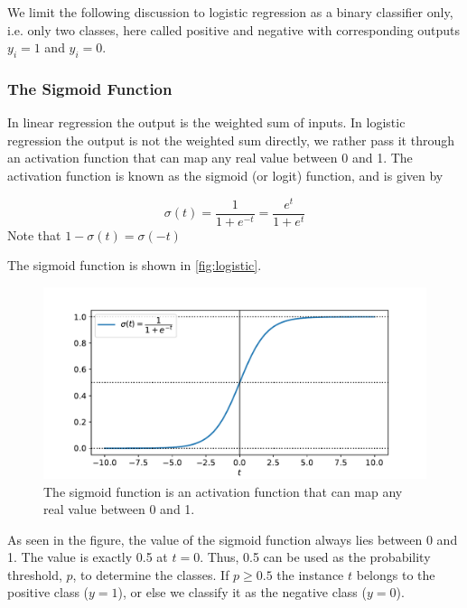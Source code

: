 We limit the following discussion to logistic regression as a binary classifier only, i.e. only two classes, here called positive and negative with corresponding outputs $y_i = 1$ and $y_i=0$.

\subsubsection{The Sigmoid Function}
In linear regression the output is the weighted sum of inputs. In logistic regression the output is not the weighted sum directly, we rather pass it through an activation function that can map any real value between 0 and 1. \cite{Hands-onML} The activation function is known as the sigmoid (or logit) function, and is given by

\begin{equation}\label{eq:sigmoid_func}
    \sigma (t) = \frac{1}{1+ e^{-t}} = \frac{e^t}{1+e^t}
\end{equation}
Note that $1-\sigma(t) = \sigma (-t)$

The sigmoid function is shown in \autoref{fig:logistic}.

\begin{figure}[H]
\begin{center}\includegraphics[scale=0.6]{latex/figures/logistic_function.pdf}
\end{center}
\caption{The sigmoid function is an activation function that can map any real value between 0 and 1.}
\label{fig:logistic}
\end{figure}

As seen in the figure, the value of the sigmoid function always lies between 0 and 1. The value is exactly 0.5 at $t=0$. Thus, 0.5 can be used as the probability threshold, $p$, to determine the classes. If $p \geq 0.5$ the instance $t$ belongs to the positive class ($y = 1$), or else we classify it as the negative class ($y = 0$). \cite{Hands-onML}

